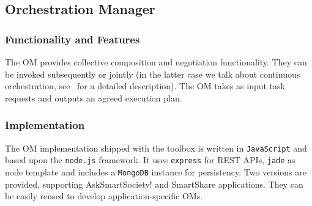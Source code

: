 \subsection{Orchestration Manager}
\subsubsection{Functionality and Features}
The OM provides collective composition and negotiation functionality. They can be invoked subsequently or jointly (in the latter case we talk about continuous orchestration, see~\cite{D6.2} for a detailed description). The OM takes as input task requests and outputs an agreed execution plan. 
\subsubsection{Implementation}
The OM implementation shipped with the toolbox is written in {\tt JavaScript} and based upon the {\tt node.js} framework. It uses {\tt express} for REST APIs, {\tt jade} as node template and includes a {\tt MongoDB} instance for persistency. Two versions are provided, supporting AskSmartSociety! and SmartShare applications. They can be easily reused to develop application-specific OMs.
